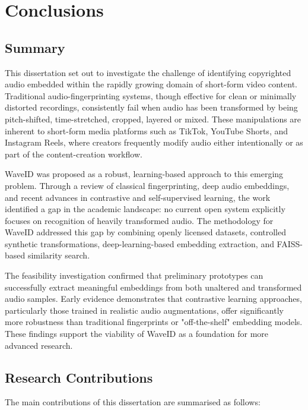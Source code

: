 \documentclass[../Thesis]{subfiles}
\begin{document}
\chapter{Conclusions} \label{chapter5}
\section{Summary}
This dissertation set out to investigate the challenge of identifying copyrighted audio embedded within the rapidly growing domain of short-form video content. Traditional audio-fingerprinting systems, though effective for clean or minimally distorted recordings, consistently fail when audio has been transformed by being pitch-shifted, time-stretched, cropped, layered or mixed. These manipulations are inherent to short-form media platforms such as TikTok, YouTube Shorts, and Instagram Reels, where creators frequently modify audio either intentionally or as part of the content-creation workflow.

WaveID was proposed as a robust, learning-based approach to this emerging problem. Through a review of classical fingerprinting, deep audio embeddings, and recent advances in contrastive and self-supervised learning, the work identified a gap in the academic landscape: no current open system explicitly focuses on recognition of heavily transformed audio. The methodology for WaveID addressed this gap by combining openly licensed datasets, controlled synthetic transformations, deep-learning-based embedding extraction, and FAISS-based similarity search.

The feasibility investigation confirmed that preliminary prototypes can successfully extract meaningful embeddings from both unaltered and transformed audio samples. Early evidence demonstrates that contrastive learning approaches, particularly those trained in realistic audio augmentations, offer significantly more robustness than traditional fingerprints or "off-the-shelf" embedding models. These findings support the viability of WaveID as a foundation for more advanced research.

\section{Research Contributions}
The main contributions of this dissertation are summarised as follows:
\end{document}
